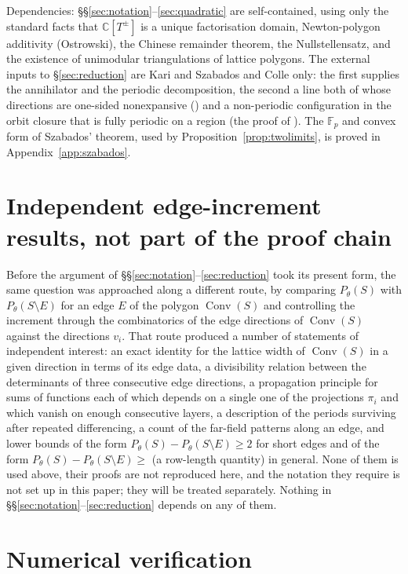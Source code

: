 \documentclass[11pt,reqno]{amsart}
\theoremstyle{plain}
\theoremstyle{definition}
\theoremstyle{remark}
\theoremstyle{plain}
\theoremstyle{remark}
\theoremstyle{definition}
\numberwithin{equation}{section}
\DeclareMathOperator{\Conv}{Conv}
\newcommand{\C}{\mathbb{C}}
\newcommand{\Fp}{\mathbb{F}_p}
\begin{document}
Dependencies: \S\S\ref{sec:notation}--\ref{sec:quadratic} are self-contained,
using only the standard facts that $\C[T^\pm]$ is a unique factorisation domain,
Newton-polygon additivity (Ostrowski), the Chinese remainder theorem, the
Nullstellensatz, and the existence of unimodular triangulations of lattice
polygons.  The external inputs to \S\ref{sec:reduction} are Kari and Szabados
\cite{KS} and Colle \cite{Colle23a} only: the first supplies the annihilator and
the periodic decomposition, the second a line both of whose directions are
one-sided nonexpansive (\cite[Theorem~1.9]{Colle23a}) and a non-periodic
configuration in the orbit closure that is fully periodic on a region
(the proof of \cite[Lemma~4.6]{Colle23a}).  The $\Fp$ and convex form of Szabados' theorem,
used by Proposition~\ref{prop:twolimits}, is proved in
Appendix~\ref{app:szabados}.

\section{Independent edge-increment results, not part of the proof
chain}\label{app:edge}

Before the argument of \S\S\ref{sec:notation}--\ref{sec:reduction} took its
present form, the same question was approached along a different route, by
comparing $P_\theta(S)$ with $P_\theta(S\setminus E)$ for an edge $E$ of the
polygon $\Conv(S)$ and controlling the increment through the combinatorics of
the edge directions of $\Conv(S)$ against the directions $v_i$.  That route
produced a number of statements of independent interest: an exact identity
for the lattice width of $\Conv(S)$ in a given direction in terms of its edge
data, a divisibility relation between the determinants of three consecutive
edge directions, a propagation principle for sums of functions each of which
depends on a single one of the projections $\pi_i$ and which vanish on enough
consecutive layers, a description of the
periods surviving after repeated differencing, a count of the far-field
patterns along an edge, and lower bounds of the form
$P_\theta(S)-P_\theta(S\setminus E)\ge2$ for short edges and of the form
$P_\theta(S)-P_\theta(S\setminus E)\ge$ (a row-length quantity) in general.
None of them is used above, their proofs are not reproduced here, and the
notation they require is not set up in this paper; they will be treated
separately.  Nothing in \S\S\ref{sec:notation}--\ref{sec:reduction} depends
on any of them.

\section{Numerical verification}\label{app:numerics}
\end{document}
